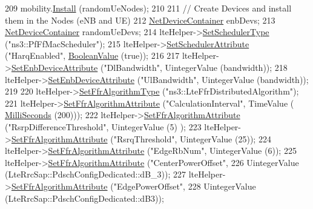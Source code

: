 \begin{DoxyCode}
209   mobility.\hyperlink{classns3_1_1MobilityHelper_a07737960ee95c0777109cf2994dd97ae}{Install} (randomUeNodes);
210 
211   \textcolor{comment}{// Create Devices and install them in the Nodes (eNB and UE)}
212   \hyperlink{classns3_1_1NetDeviceContainer}{NetDeviceContainer} enbDevs;
213   \hyperlink{classns3_1_1NetDeviceContainer}{NetDeviceContainer} randomUeDevs;
214   lteHelper->\hyperlink{classns3_1_1LteHelper_a8f86e55b8b80a81732c4b2df00fb25d5}{SetSchedulerType} (\textcolor{stringliteral}{"ns3::PfFfMacScheduler"});
215   lteHelper->\hyperlink{classns3_1_1LteHelper_a38f8c7f4592b31c0f3dedb53e7909742}{SetSchedulerAttribute} (\textcolor{stringliteral}{"HarqEnabled"},  
      \hyperlink{classns3_1_1BooleanValue}{BooleanValue} (\textcolor{keyword}{true}));
216 
217   lteHelper->\hyperlink{classns3_1_1LteHelper_ac42f0f3d6cd8473d810bfbbeb5d592e0}{SetEnbDeviceAttribute} (\textcolor{stringliteral}{"DlBandwidth"}, UintegerValue (bandwidth));
218   lteHelper->\hyperlink{classns3_1_1LteHelper_ac42f0f3d6cd8473d810bfbbeb5d592e0}{SetEnbDeviceAttribute} (\textcolor{stringliteral}{"UlBandwidth"}, UintegerValue (bandwidth));
219 
220   lteHelper->\hyperlink{classns3_1_1LteHelper_a035c6b03305c1511975362f80425b5fc}{SetFfrAlgorithmType} (\textcolor{stringliteral}{"ns3::LteFfrDistributedAlgorithm"});
221   lteHelper->\hyperlink{classns3_1_1LteHelper_a793d56e843a844428851e90752c5f130}{SetFfrAlgorithmAttribute} (\textcolor{stringliteral}{"CalculationInterval"}, TimeValue (
      \hyperlink{group__timecivil_gaf26127cf4571146b83a92ee18679c7a9}{MilliSeconds} (200)));
222   lteHelper->\hyperlink{classns3_1_1LteHelper_a793d56e843a844428851e90752c5f130}{SetFfrAlgorithmAttribute} (\textcolor{stringliteral}{"RsrpDifferenceThreshold"}, UintegerValue (5)
      );
223   lteHelper->\hyperlink{classns3_1_1LteHelper_a793d56e843a844428851e90752c5f130}{SetFfrAlgorithmAttribute} (\textcolor{stringliteral}{"RsrqThreshold"}, UintegerValue (25));
224   lteHelper->\hyperlink{classns3_1_1LteHelper_a793d56e843a844428851e90752c5f130}{SetFfrAlgorithmAttribute} (\textcolor{stringliteral}{"EdgeRbNum"}, UintegerValue (6));
225   lteHelper->\hyperlink{classns3_1_1LteHelper_a793d56e843a844428851e90752c5f130}{SetFfrAlgorithmAttribute} (\textcolor{stringliteral}{"CenterPowerOffset"},
226                                        UintegerValue (LteRrcSap::PdschConfigDedicated::dB\_3));
227   lteHelper->\hyperlink{classns3_1_1LteHelper_a793d56e843a844428851e90752c5f130}{SetFfrAlgorithmAttribute} (\textcolor{stringliteral}{"EdgePowerOffset"},
228                                        UintegerValue (LteRrcSap::PdschConfigDedicated::dB3));

\end{DoxyCode}
